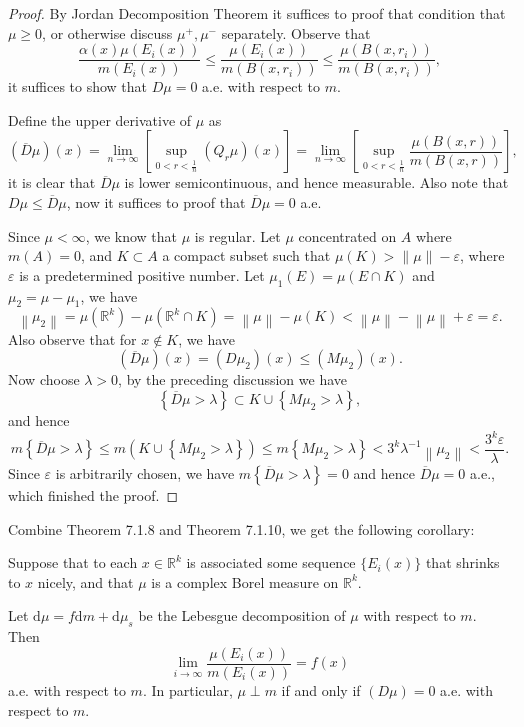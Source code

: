 \begin{proof}
By Jordan Decomposition Theorem it suffices to proof that condition that $\mu\ge 0$, or otherwise discuss $\mu^+,\mu^-$ separately. Observe that 
$$
\frac{\alpha \left( x \right) \mu \left( E_i\left( x \right) \right)}{m\left( E_i\left( x \right) \right)}\le \frac{\mu \left( E_i\left( x \right) \right)}{m\left( B\left( x,r_i \right) \right)}\le \frac{\mu \left( B\left( x,r_i \right) \right)}{m\left( B\left( x,r_i \right) \right)},
$$
it suffices to show that $D\mu=0$ a.e. with respect to $m$.\par
Define the upper derivative of $\mu$ as 
$$
\left( \overline{D}\mu \right) \left( x \right) =\lim_{n\rightarrow \infty} \left[ \mathop {\mathrm{sup}} \limits_{0<r<\frac{1}{n}}\left( Q_r\mu \right) \left( x \right) \right] =\lim_{n\rightarrow \infty} \left[ \mathop {\mathrm{sup}} \limits_{0<r<\frac{1}{n}}\frac{\mu \left( B\left( x,r \right) \right)}{m\left( B\left( x,r \right) \right)} \right] ,
$$
it is clear that $\overline{D}\mu$ is lower semicontinuous, and hence measurable. Also note that $D\mu\le\overline{D}\mu$, now it suffices to proof that $\overline{D}\mu=0$ a.e.\par
Since $\mu<\infty$, we know that $\mu$ is regular. Let $\mu$ concentrated on $A$ where $m(A)=0$, and $K\subset A$ a compact subset such that $\mu(K)>\|\mu\|-\varepsilon$, where $\varepsilon$ is a predetermined positive number. Let $\mu_1(E)=\mu(E\cap K)$ and $\mu_2=\mu-\mu_1$, we have 
$$
\left\| \mu _2 \right\| =\mu \left( \mathbb{R} ^k \right) -\mu \left( \mathbb{R} ^k\cap K \right) =\left\| \mu \right\| -\mu \left( K \right) <\left\| \mu \right\| -\left\| \mu \right\| +\varepsilon =\varepsilon .
$$
Also observe that for $x\notin K$, we have 
$$
\left( \overline{D}\mu \right) \left( x \right) =\left( D\mu _2 \right) \left( x \right) \le \left( M\mu _2 \right) \left( x \right) .
$$
Now choose $\lambda>0$, by the preceding discussion we have 
$$
\left\{ \overline{D}\mu >\lambda \right\} \subset K\cup \left\{ M\mu _2>\lambda \right\} ,
$$
and hence 
$$
m\left\{ \overline{D}\mu >\lambda \right\} \le m\left( K\cup \left\{ M\mu _2>\lambda \right\} \right) \le m\left\{ M\mu _2>\lambda \right\} <3^k\lambda ^{-1}\left\| \mu _2 \right\| <\frac{3^k\varepsilon}{\lambda}.
$$
Since $\varepsilon$ is arbitrarily chosen, we have $m\left\{ \overline{D}\mu >\lambda \right\}=0$ and hence $\overline{D}\mu=0$ a.e., which finished the proof.
\end{proof}
Combine Theorem 7.1.8 and Theorem 7.1.10, we get the following corollary:
\begin{corollary}
Suppose that to each $x\in\mathbb{R}^k$ is associated some sequence $\{E_i(x)\}$ that shrinks to $x$ nicely, and that $\mu$ is a complex Borel measure on $\mathbb{R}^k$.\par
Let $\mathrm{d}\mu=f\mathrm{d}m+\mathrm{d}\mu_s$ be the Lebesgue decomposition of $\mu$ with respect to $m$. Then 
$$
\lim_{i\rightarrow \infty} \frac{\mu \left( E_i\left( x \right) \right)}{m\left( E_i\left( x \right) \right)}=f\left( x \right) 
$$
a.e. with respect to $m$. In particular, $\mu\perp m$ if and only if $(D\mu)=0$ a.e. with respect to $m$.
\end{corollary}
